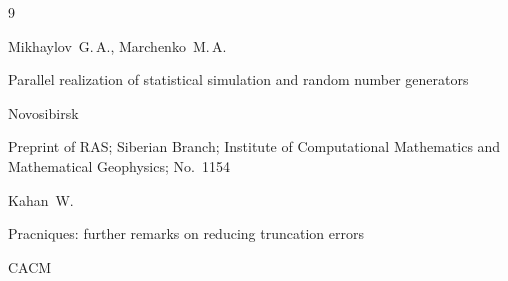 \begin{thebibliography}{9}

\misctransl 

\by Mikhaylov~G.\,A., Marchenko~M.\,A.

\preprint Parallel realization of statistical simulation and random number generators

        \publaddr Novosibirsk

        \preprintinfo Preprint of RAS; Siberian Branch; Institute of Computational Mathematics and Mathematical Geophysics; No.~1154






        \by Kahan~W.

        \paper Pracniques: further remarks on reducing truncation errors

        \jour CACM








\end{thebibliography}



\noindent

\hskip6.5cm \thedate \par\noindent

\hskip6.5cm\therevdate






\makeengtitle





\renewcommand{\baselinestretch}{0.9}



\newpage





%

